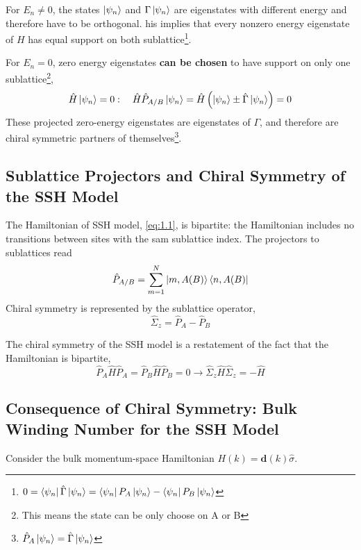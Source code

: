For $E_n \neq 0$, the states $\ket{\psi_n}$ and $\Gamma\ket{\psi_n}$ are eigenstates with different energy and therefore have to be orthogonal.
his implies that every nonzero energy eigenstate of $H$ has equal support on both sublattice\footnote{$0 = \bra{\psi_n} \hat{\Gamma} \ket{\psi_n} = \bra{\psi_n}P_A\ket{\psi_n}- \bra{\psi_n} P_B \ket{\psi_n}$}.

For $E_n = 0$, zero energy eigenstates \textbf{can be chosen} to have support on only one sublattice\footnote{This means the state can be only choose on A or B},
\begin{equation}
    \label{eq:1.32}
    \hat{H}\ket{\psi_n} = 0 : ~ ~ ~ \hat{H} \hat{P}_{A/B} \ket{\psi_n} = \hat{H} \left( \ket{\psi_n} \pm \hat{\Gamma}\ket{\psi_n}\right) = 0
\end{equation}
These projected zero-energy eigenstates are eigenstates of $\Gamma$, and therefore are chiral symmetric partners of themselves\footnote{$\hat{P}_A \ket{\psi_n} = \hat{\Gamma} \ket{\psi_n}$ }.

\subsection{Sublattice Projectors and Chiral Symmetry of the SSH Model}\label{sec:1.4.4}
The Hamiltonian of SSH model, \eqref{eq:1.1}, is bipartite: the Hamiltonian includes no transitions between sites with the sam sublattice index.
The projectors to sublattices read
\begin{equation}
    \hat{P}_{A/B} = \sum_{m=1}^N \ket{m,A(B)} \bra{n,A(B)}
    \label{eq:1.33}
\end{equation}
Chiral symmetry is represented by the sublattice operator,
\begin{equation}
    \hat{\Sigma}_z = \hat{P}_A - \hat{P}_B
    \label{eq:1.34}
\end{equation}

The chiral symmetry of the SSH model is a restatement of the fact that the Hamiltonian is bipartite,
\begin{equation}
    \hat{P}_A \hat{H} \hat{P}_A = \hat{P}_B \hat{H} \hat{P}_B = 0 \to \hat{\Sigma}_z \hat{H} \hat{\Sigma}_z = - \hat{H}
    \label{eq:1.35}
\end{equation}

\subsection{Consequence of Chiral Symmetry: Bulk Winding Number for the SSH Model}\label{sec:1.4.5}
Consider the bulk momentum-space Hamiltonian $H(k) = \mathbf{d}(k) \hat{\sigma}$.

